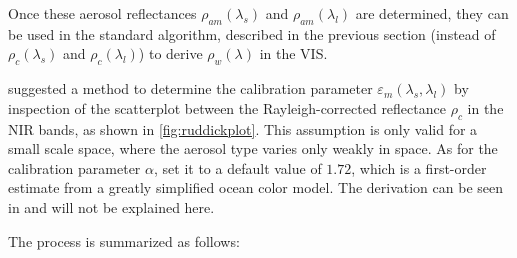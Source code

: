 Once these aerosol reflectances $\rho_{am}(\lambda_s)$ and $\rho_{am}(\lambda_l)$ are determined, they can be used in the standard algorithm, described in the previous section (instead of $\rho_c(\lambda_s)$ and $\rho_c(\lambda_l)$) to derive $\rho_w(\lambda)$ in the VIS.

\citet{Ruddick:2000bs} suggested a method to determine the calibration parameter $\varepsilon_m(\lambda_s,\lambda_l)$ by inspection of the scatterplot between the Rayleigh-corrected reflectance $\rho_c$ in the NIR bands, as shown in \autoref{fig:ruddickplot}. This assumption is only valid for a small scale space, where the aerosol type varies only weakly in space. As for the calibration parameter $\alpha$, \citet{Ruddick:2000bs} set it to a default value of $1.72$, which is a first-order estimate from a greatly simplified ocean color model. The derivation can be seen in \citet{Ruddick:2000bs} and will not be explained here.

The process is summarized as follows:

